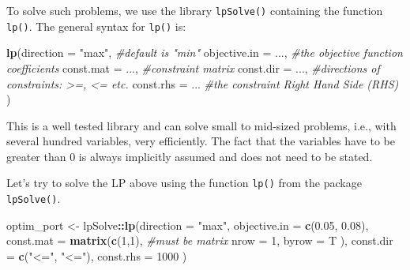 \documentclass[11pt,]{article}
\newenvironment{Shaded}{\begin{snugshade}}{\end{snugshade}}
\newcommand{\KeywordTok}[1]{\textcolor[rgb]{0.13,0.29,0.53}{\textbf{#1}}}
\newcommand{\DataTypeTok}[1]{\textcolor[rgb]{0.13,0.29,0.53}{#1}}
\newcommand{\DecValTok}[1]{\textcolor[rgb]{0.00,0.00,0.81}{#1}}
\newcommand{\FloatTok}[1]{\textcolor[rgb]{0.00,0.00,0.81}{#1}}
\newcommand{\StringTok}[1]{\textcolor[rgb]{0.31,0.60,0.02}{#1}}
\newcommand{\CommentTok}[1]{\textcolor[rgb]{0.56,0.35,0.01}{\textit{#1}}}
\newcommand{\OperatorTok}[1]{\textcolor[rgb]{0.81,0.36,0.00}{\textbf{#1}}}
\newcommand{\NormalTok}[1]{#1}
\begin{document}
To solve such problems, we use the library \texttt{lpSolve()} containing
the function \texttt{lp()}. The general syntax for \texttt{lp()} is:

\begin{Shaded}
\begin{Highlighting}[]
\KeywordTok{lp}\NormalTok{(}\DataTypeTok{direction =} \StringTok{"max"}\NormalTok{, }\CommentTok{#default is "min"}
   \DataTypeTok{objective.in =}\NormalTok{ ..., }\CommentTok{#the objective function coefficients}
   \DataTypeTok{const.mat =}\NormalTok{ ..., }\CommentTok{#constraint matrix }
   \DataTypeTok{const.dir =}\NormalTok{ ..., }\CommentTok{#directions of constraints: >=, <= etc.}
   \DataTypeTok{const.rhs =}\NormalTok{ ...  }\CommentTok{#the constraint Right Hand Side (RHS)}
\NormalTok{   ) }
\end{Highlighting}
\end{Shaded}

This is a well tested library and can solve small to mid-sized problems,
i.e., with several hundred variables, very efficiently. The fact that
the variables have to be greater than 0 is always implicitly assumed and
does not need to be stated.

Let's try to solve the LP above using the function \texttt{lp()} from
the package \texttt{lpSolve()}.

\begin{Shaded}
\begin{Highlighting}[]
\NormalTok{optim_port <-}\StringTok{ }\NormalTok{lpSolve}\OperatorTok{::}\KeywordTok{lp}\NormalTok{(}\DataTypeTok{direction =} \StringTok{"max"}\NormalTok{,}
                          \DataTypeTok{objective.in =} \KeywordTok{c}\NormalTok{(}\FloatTok{0.05}\NormalTok{, }\FloatTok{0.08}\NormalTok{),}
                          \DataTypeTok{const.mat =} \KeywordTok{matrix}\NormalTok{(}\KeywordTok{c}\NormalTok{(}\DecValTok{1}\NormalTok{,}\DecValTok{1}\NormalTok{), }\CommentTok{#must be matrix}
                                             \DataTypeTok{nrow =} \DecValTok{1}\NormalTok{,}
                                             \DataTypeTok{byrow =}\NormalTok{ T}
\NormalTok{                                             ),}
                          \DataTypeTok{const.dir =} \KeywordTok{c}\NormalTok{(}\StringTok{"<="}\NormalTok{, }\StringTok{"<="}\NormalTok{),}
                          \DataTypeTok{const.rhs =} \DecValTok{1000}
\NormalTok{                          )}
\end{Highlighting}
\end{Shaded}
\end{document}
